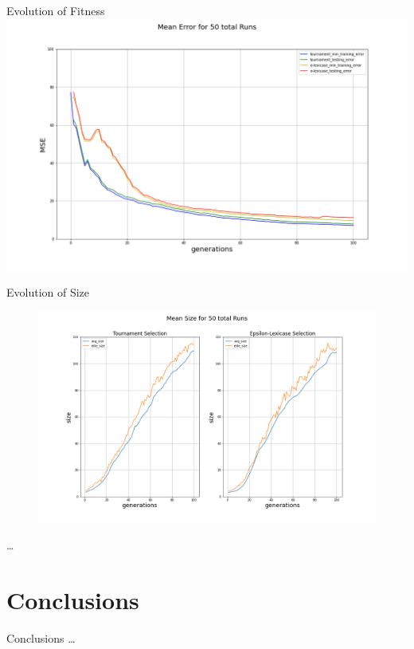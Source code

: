\documentclass[
  ignorenonframetext,
]{beamer}
\begin{document}
\begin{frame}{Evolution of Fitness}
\protect\hypertarget{evolution-of-fitness}{}
\includegraphics{../plots/mean_error_combined.png}
\end{frame}

\begin{frame}{Evolution of Size}
\protect\hypertarget{evolution-of-size}{}
\begin{figure}
\centering
\includegraphics{../plots/size_subplotted.png}
\end{figure}

\ldots{}
\end{frame}

\hypertarget{conclusions}{%
\section{Conclusions}\label{conclusions}}

\begin{frame}{Conclusions}
\ldots{}
\end{frame}
\end{document}
